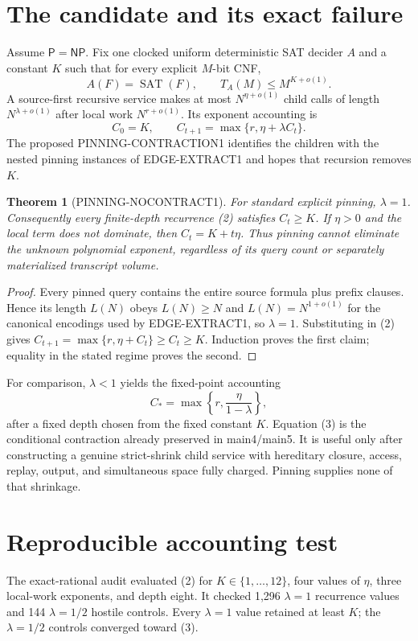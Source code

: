 \documentclass[11pt]{article}
\newtheorem{theorem}{Theorem}
\newcommand{\Pclass}{\mathsf P}
\newcommand{\NPclass}{\mathsf{NP}}
\begin{document}
\section{The candidate and its exact failure}
Assume $\Pclass=\NPclass$.  Fix one clocked uniform deterministic SAT decider
$A$ and a constant $K$ such that for every explicit $M$-bit CNF,
\[
A(F)=\operatorname{SAT}(F),\qquad T_A(M)\le M^{K+o(1)}.
\tag{1}
\]
A source-first recursive service makes at most $N^{\eta+o(1)}$ child calls of
length $N^{\lambda+o(1)}$ after local work $N^{r+o(1)}$.  Its exponent
accounting is
\[
C_0=K,\qquad C_{t+1}=\max\{r,\eta+\lambda C_t\}.
\tag{2}
\]
The proposed \textsf{PINNING-CONTRACTION1} identifies the children with the
nested pinning instances of EDGE-EXTRACT1 and hopes that recursion removes
$K$.

\begin{theorem}[PINNING-NOCONTRACT1]
For standard explicit pinning, $\lambda=1$.  Consequently every finite-depth
recurrence (2) satisfies $C_t\ge K$.  If $\eta>0$ and the local term does not
dominate, then $C_t=K+t\eta$.  Thus pinning cannot eliminate the unknown
polynomial exponent, regardless of its query count or separately
materialized transcript volume.
\end{theorem}

\begin{proof}
Every pinned query contains the entire source formula plus prefix clauses.
Hence its length $L(N)$ obeys $L(N)\ge N$ and
$L(N)=N^{1+o(1)}$ for the canonical encodings used by EDGE-EXTRACT1, so
$\lambda=1$.  Substituting in (2) gives
$C_{t+1}=\max\{r,\eta+C_t\}\ge C_t\ge K$.  Induction proves the first
claim; equality in the stated regime proves the second.
\end{proof}

For comparison, $\lambda<1$ yields the fixed-point accounting
\[
C_*=\max\left\{r,\frac{\eta}{1-\lambda}\right\},
\tag{3}
\]
after a fixed depth chosen from the fixed constant $K$.  Equation (3) is the
conditional contraction already preserved in main4/main5.  It is useful only
after constructing a genuine strict-shrink child service with hereditary
closure, access, replay, output, and simultaneous space fully charged.
Pinning supplies none of that shrinkage.

\section{Reproducible accounting test}
The exact-rational audit evaluated (2) for
$K\in\{1,\ldots,12\}$, four values of $\eta$, three local-work exponents, and
depth eight.  It checked 1,296 $\lambda=1$ recurrence values and 144
$\lambda=1/2$ hostile controls.  Every $\lambda=1$ value retained at least
$K$; the $\lambda=1/2$ controls converged toward (3).
\end{document}
